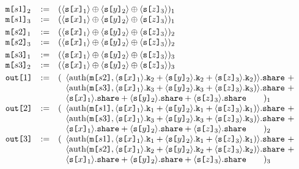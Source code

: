$$
\begin{array}{lll}
  \texttt{m[}s1\texttt{]}_{2} &:=&
  (\langle \texttt{s[}x\texttt{]}_{1} \rangle\oplus\langle \texttt{s[}y\texttt{]}_{2} \rangle
    \oplus\langle \texttt{s[}z\texttt{]}_{3} \rangle)_{1}\\
  \texttt{m[}s1\texttt{]}_{3} &:=&
  (\langle \texttt{s[}x\texttt{]}_{1} \rangle\oplus\langle \texttt{s[}y\texttt{]}_{2} \rangle
    \oplus\langle \texttt{s[}z\texttt{]}_{3} \rangle)_{1}\\[1mm]
  \texttt{m[}s2\texttt{]}_{1} &:=&
  (\langle \texttt{s[}x\texttt{]}_{1} \rangle\oplus\langle \texttt{s[}y\texttt{]}_{2} \rangle
    \oplus\langle \texttt{s[}z\texttt{]}_{3} \rangle)_{2}\\
  \texttt{m[}s2\texttt{]}_{3} &:=&
  (\langle \texttt{s[}x\texttt{]}_{1} \rangle\oplus\langle \texttt{s[}y\texttt{]}_{2} \rangle
    \oplus\langle \texttt{s[}z\texttt{]}_{3} \rangle)_{2}\\[1mm]
  \texttt{m[}s3\texttt{]}_{1} &:=&
  (\langle \texttt{s[}x\texttt{]}_{1} \rangle\oplus\langle \texttt{s[}y\texttt{]}_{2} \rangle
    \oplus\langle \texttt{s[}z\texttt{]}_{3} \rangle)_{3}\\
  \texttt{m[}s3\texttt{]}_{2} &:=&
  (\langle \texttt{s[}x\texttt{]}_{1} \rangle\oplus\langle \texttt{s[}y\texttt{]}_{2} \rangle
    \oplus\langle \texttt{s[}z\texttt{]}_{3} \rangle)_{3}\\[1mm]
  \texttt{out[}1\texttt{]} &:=&(
  \begin{array}[t]{l}
  \langle \mathrm{auth}(\texttt{m[}s2\texttt{]},\langle \texttt{s[}x\texttt{]}_{1} \rangle.\texttt{k}_{2}+\langle \texttt{s[}y\texttt{]}_{2} \rangle.\texttt{k}_{2}
    +\langle \texttt{s[}z\texttt{]}_{3} \rangle.\texttt{k}_{2}) \rangle.\texttt{share}\ +\\
  \langle \mathrm{auth}(\texttt{m[}s3\texttt{]},\langle \texttt{s[}x\texttt{]}_{1} \rangle.\texttt{k}_{3}+\langle \texttt{s[}y\texttt{]}_{2} \rangle.\texttt{k}_{3}
    +\langle \texttt{s[}z\texttt{]}_{3} \rangle.\texttt{k}_{3}) \rangle.\texttt{share}\ +\\
  \langle \texttt{s[}x\texttt{]}_{1} \rangle.\texttt{share}+ \langle \texttt{s[}y\texttt{]}_{2} \rangle.\texttt{share}
    + \langle \texttt{s[}z\texttt{]}_{3} \rangle.\texttt{share}\qquad )_1
  \end{array}\\
  \texttt{out[}2\texttt{]} &:=&(
  \begin{array}[t]{l}
  \langle \mathrm{auth}(\texttt{m[}s1\texttt{]},\langle \texttt{s[}x\texttt{]}_{1} \rangle.\texttt{k}_{1}+\langle \texttt{s[}y\texttt{]}_{2} \rangle.\texttt{k}_{1}
    +\langle \texttt{s[}z\texttt{]}_{3} \rangle.\texttt{k}_{1}) \rangle.\texttt{share}\ +\\
  \langle \mathrm{auth}(\texttt{m[}s3\texttt{]},\langle \texttt{s[}x\texttt{]}_{1} \rangle.\texttt{k}_{3}+\langle \texttt{s[}y\texttt{]}_{2} \rangle.\texttt{k}_{3}
    +\langle \texttt{s[}z\texttt{]}_{3} \rangle.\texttt{k}_{3}) \rangle.\texttt{share}\ +\\
  \langle \texttt{s[}x\texttt{]}_{1} \rangle.\texttt{share}+ \langle \texttt{s[}y\texttt{]}_{2} \rangle.\texttt{share}
    + \langle \texttt{s[}z\texttt{]}_{3} \rangle.\texttt{share}\qquad )_2
  \end{array}\\
  \texttt{out[}3\texttt{]} &:=&(
  \begin{array}[t]{l}
  \langle \mathrm{auth}(\texttt{m[}s1\texttt{]},\langle \texttt{s[}x\texttt{]}_{1} \rangle.\texttt{k}_{1}+\langle \texttt{s[}y\texttt{]}_{2} \rangle.\texttt{k}_{1}
    +\langle \texttt{s[}z\texttt{]}_{3} \rangle.\texttt{k}_{1}) \rangle.\texttt{share}\ +\\
  \langle \mathrm{auth}(\texttt{m[}s2\texttt{]},\langle \texttt{s[}x\texttt{]}_{1} \rangle.\texttt{k}_{2}+\langle \texttt{s[}y\texttt{]}_{2} \rangle.\texttt{k}_{2}
    +\langle \texttt{s[}z\texttt{]}_{3} \rangle.\texttt{k}_{2}) \rangle.\texttt{share}\ +\\
  \langle \texttt{s[}x\texttt{]}_{1} \rangle.\texttt{share}+ \langle \texttt{s[}y\texttt{]}_{2} \rangle.\texttt{share}
    + \langle \texttt{s[}z\texttt{]}_{3} \rangle.\texttt{share}\qquad )_3
  \end{array}\\
\end{array}
$$

